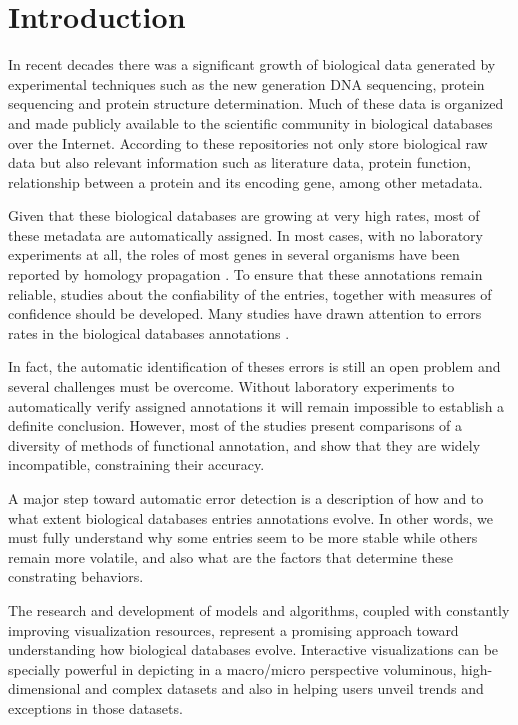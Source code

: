 \section{Introduction} 
\label{sec:introduction} 

In recent decades there was a significant growth of biological data generated by experimental techniques such as the new generation DNA sequencing, protein sequencing and protein structure determination. Much of these data is organized and made publicly available to the scientific community in biological databases over the Internet. According to \cite{lesk2005database} these repositories not only store biological raw data but also relevant information such as literature data, protein function, relationship between a protein and its encoding gene, among other metadata.

Given that these biological databases are growing at very high rates, most of these metadata are automatically assigned. In most cases, with no laboratory experiments at all, the roles of most genes in several organisms have been reported by homology propagation \cite{brenner1999errors}. To ensure that these annotations remain reliable, studies about the confiability of the entries, together with measures of confidence should be developed. Many studies have drawn attention to errors rates in the biological databases annotations \cite{devos2001intrinsic,green2005genome,gilks2005percolation,jones2007estimating,schnoes2009annotation,hung2010detect}.

In fact, the automatic identification of theses errors is still an open problem and several challenges must be overcome. Without laboratory experiments to automatically verify assigned annotations it will remain impossible to establish a definite conclusion. However, most of the studies present comparisons of a diversity of methods of functional annotation, and show that they are widely incompatible, constraining their accuracy. 

A major step toward automatic error detection is a description of how and to what extent biological databases entries annotations evolve. In other words, we must fully understand why some entries seem to be more stable while others remain more volatile, and also what are the factors that determine these constrating behaviors. %

The research and development of models and algorithms, coupled with constantly improving visualization resources, represent a promising approach toward understanding how biological databases evolve. Interactive visualizations can be specially powerful in depicting in a macro/micro perspective voluminous, high-dimensional and complex datasets and also in helping users unveil trends and exceptions in those datasets. 

